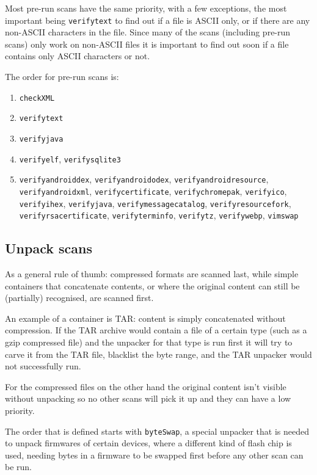 \documentclass[10pt,a4paper]{article}
\begin{document}
Most pre-run scans have the same priority, with a few exceptions, the most
important being \texttt{verifytext} to find out if a file is ASCII only, or if
there are any non-ASCII characters in the file. Since many of the scans
(including pre-run scans) only work on non-ASCII files it is important to find
out soon if a file contains only ASCII characters or not.

The order for pre-run scans is:

\begin{enumerate}
\item \texttt{checkXML}
\item \texttt{verifytext}
\item \texttt{verifyjava}
\item \texttt{verifyelf}, \texttt{verifysqlite3}
\item \texttt{verifyandroiddex}, \texttt{verifyandroidodex},
\texttt{verifyandroidresource}, \texttt{verifyandroidxml},
\texttt{verifycertificate}, \texttt{verifychromepak}, \texttt{verifyico},
\texttt{verifyihex}, \texttt{verifyjava}, \texttt{verifymessagecatalog},
\texttt{verifyresourcefork}, \texttt{verifyrsacertificate},
\texttt{verifyterminfo}, \texttt{verifytz}, \texttt{verifywebp},
\texttt{vimswap}
\end{enumerate}

\subsection{Unpack scans}

As a general rule of thumb: compressed formats are scanned last, while
simple containers that concatenate contents, or where the original content can
still be (partially) recognised, are scanned first.

An example of a container is TAR: content is simply concatenated without
compression. If the TAR archive would contain a file of a certain type (such as
a gzip compressed file) and the unpacker for that type is run first it will try
to carve it from the TAR file, blacklist the byte range, and the TAR unpacker
would not successfully run.

For the compressed files on the other hand the original content isn't visible
without unpacking so no other scans will pick it up and they can have a low
priority.

The order that is defined starts with \texttt{byteSwap}, a special unpacker
that is needed to unpack firmwares of certain devices, where a different kind
of flash chip is used, needing bytes in a firmware to be swapped first before
any other scan can be run.
\end{document}
